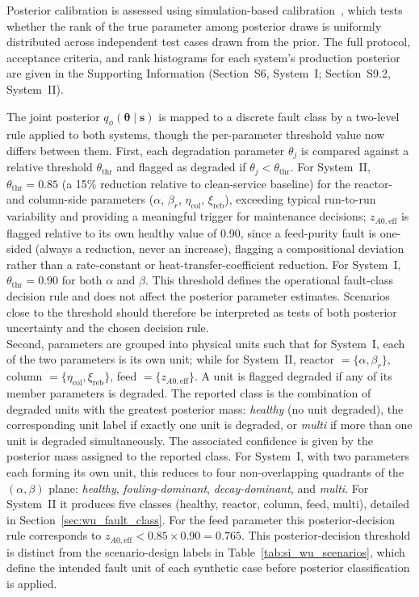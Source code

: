 \documentclass[aps,pre,twocolumn,superscriptaddress,floatfix]{revtex4-2}
\begin{document}
Posterior calibration is assessed using simulation-based calibration~\citep{Talts2018}, 
which tests whether the rank of the true parameter among posterior draws is uniformly
distributed across independent test cases drawn from the prior. 
The full protocol, acceptance criteria, and rank histograms for each system's production posterior are
given in the Supporting Information (Section~S6, System~I; Section~S9.2, System~II).

\label{sec:fault_class}
The joint posterior $q_\phi(\boldsymbol{\theta}\mid\mathbf{s})$ is mapped 
to a discrete fault class by a two-level rule applied to both systems, though
the per-parameter threshold value now differs between them. First, each
degradation parameter $\theta_j$ is compared against a relative threshold
$\theta_\mathrm{thr}$ and flagged as degraded if $\theta_j<\theta_\mathrm{thr}$. 
For System~II, $\theta_\mathrm{thr}=0.85$ (a 15\% reduction relative to clean-service
baseline) for the reactor- and column-side parameters ($\alpha$, $\beta_r$, 
$\eta_\mathrm{col}$, $\xi_\mathrm{reb}$), exceeding typical run-to-run variability
and providing a meaningful trigger for maintenance decisions; $z_{A0,\mathrm{eff}}$
is flagged relative to its own healthy value of 0.90, since a feed-purity fault is
one-sided (always a reduction, never an increase), flagging a compositional deviation
rather than a rate-constant or heat-transfer-coefficient reduction. For System~I, 
$\theta_\mathrm{thr}=0.90$ for both $\alpha$ and $\beta$. This threshold defines
the operational fault-class decision rule and does not affect the posterior
parameter estimates. Scenarios close to the threshold should therefore be
interpreted as tests of both posterior uncertainty and the chosen decision rule.\\
Second, parameters are grouped into physical units such
that for System~I, each of the two parameters is its own unit; while for System~II, 
reactor $=\{\alpha,\beta_r\}$, column $=\{\eta_\mathrm{col},\xi_\mathrm{reb}\}$, 
feed $=\{z_{A0,\mathrm{eff}}\}$. A unit is flagged degraded if any of its member 
parameters is degraded. The reported class is the combination of degraded units with 
the greatest posterior mass: \emph{healthy} (no unit degraded), the corresponding 
unit label if exactly one unit is degraded, or \emph{multi} 
if more than one unit is degraded simultaneously. The associated confidence is given
by the posterior mass assigned to the reported class. For System~I, with 
two parameters each forming its own unit, this reduces to four non-overlapping
quadrants of the $(\alpha,\beta)$ plane: \emph{healthy}, \emph{fouling-dominant},
\emph{decay-dominant}, and \emph{multi}. For System~II it produces five classes 
(healthy, reactor, column, feed, multi), detailed in Section~\ref{sec:wu_fault_class}.
For the feed parameter this posterior-decision rule corresponds to
$z_{A0,\mathrm{eff}} < 0.85\times0.90 = 0.765$. This posterior-decision threshold is
distinct from the scenario-design labels in Table~\ref{tab:si_wu_scenarios}, which 
define the intended fault unit of each synthetic case before posterior classification is applied.
\end{document}
